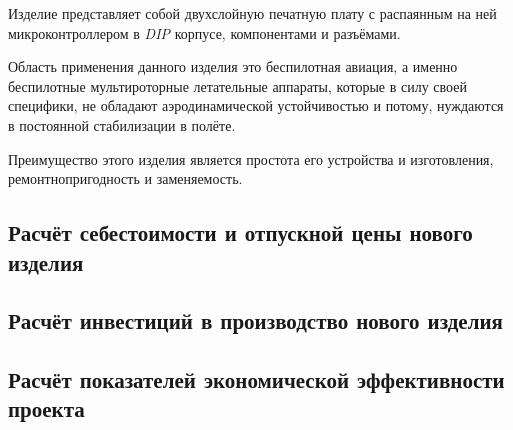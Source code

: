 Изделие представляет собой двухслойную печатную плату с распаянным на
ней микроконтроллером в \textit{DIP} корпусе, компонентами и
разъёмами.

Область применения данного изделия это беспилотная авиация, а именно
беспилотные мультироторные летательные аппараты, которые в силу своей
специфики, не обладают аэродинамической устойчивостью и потому,
нуждаются в постоянной стабилизации в полёте.


Преимущество этого изделия является простота его устройства и
изготовления, ремонтнопригодность и заменяемость.

\subsection{Расчёт себестоимости и отпускной цены нового изделия}



\subsection{Расчёт инвестиций в производство нового изделия}

\subsection{Расчёт показателей экономической эффективности проекта}




\newpage

